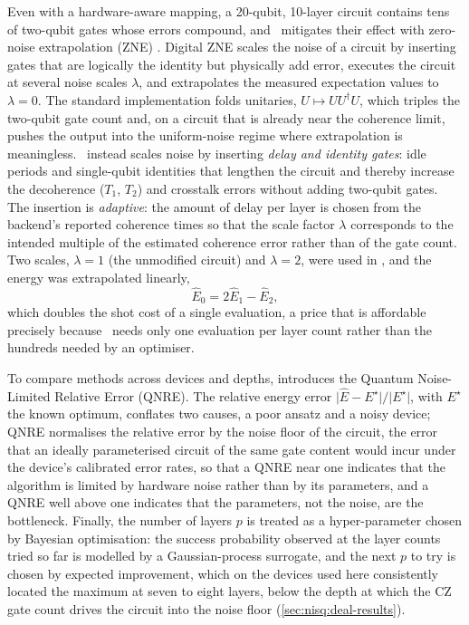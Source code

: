 Even with a hardware-aware mapping, a 20-qubit, 10-layer circuit contains tens of two-qubit gates whose errors compound, and \deal\ mitigates their effect with zero-noise extrapolation (ZNE) \cite{temme2017errormitigation,kandala2019errormitigation}. Digital ZNE \cite{giurgicatiron2020digitalzne} scales the noise of a circuit by inserting gates that are logically the identity but physically add error, executes the circuit at several noise scales $\lambda$, and extrapolates the measured expectation values to $\lambda=0$. The standard implementation folds unitaries, $U\mapsto UU^{\dagger}U$, which triples the two-qubit gate count and, on a circuit that is already near the coherence limit, pushes the output into the uniform-noise regime where extrapolation is meaningless. \deal\ instead scales noise by inserting \emph{delay and identity gates}: idle periods and single-qubit identities that lengthen the circuit and thereby increase the decoherence ($T_{1}$, $T_{2}$) and crosstalk errors without adding two-qubit gates. The insertion is \emph{adaptive}: the amount of delay per layer is chosen from the backend's reported coherence times so that the scale factor $\lambda$ corresponds to the intended multiple of the estimated coherence error rather than of the gate count. Two scales, $\lambda=1$ (the unmodified circuit) and $\lambda=2$, were used in \cite{guo2025deal}, and the energy was extrapolated linearly,
\begin{equation}\label{eq:nisq:zne}
  \hat{E}_{0} = 2\hat{E}_{1} - \hat{E}_{2},
\end{equation}
which doubles the shot cost of a single evaluation, a price that is affordable precisely because \deal\ needs only one evaluation per layer count rather than the hundreds needed by an optimiser.

To compare methods across devices and depths, \cite{guo2025deal} introduces the Quantum Noise-Limited Relative Error (QNRE). The relative energy error $\lvert\hat{E}-E^{\star}\rvert/\lvert E^{\star}\rvert$, with $E^{\star}$ the known optimum, conflates two causes, a poor ansatz and a noisy device; QNRE normalises the relative error by the noise floor of the circuit, the error that an ideally parameterised circuit of the same gate content would incur under the device's calibrated error rates, so that a QNRE near one indicates that the algorithm is limited by hardware noise rather than by its parameters, and a QNRE well above one indicates that the parameters, not the noise, are the bottleneck. Finally, the number of layers $p$ is treated as a hyper-parameter chosen by Bayesian optimisation: the success probability observed at the layer counts tried so far is modelled by a Gaussian-process surrogate, and the next $p$ to try is chosen by expected improvement, which on the devices used here consistently located the maximum at seven to eight layers, below the depth at which the CZ gate count drives the circuit into the noise floor (\cref{sec:nisq:deal-results}).

